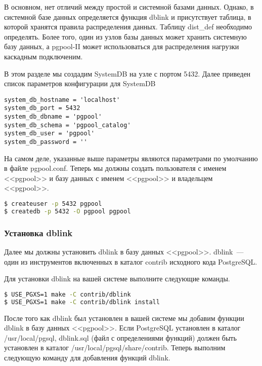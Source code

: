 В основном, нет отличий между простой и системной базами данных. Однако, в системной базе данных определяется функция dblink и присутствует таблица, в которой хранятся правила распределения данных. Таблицу dist\_def необходимо определять. Более того, один из узлов базы данных может хранить системную базу данных, а pgpool-II может использоваться для распределения нагрузки каскадным подключеним.

В этом разделе мы создадим SystemDB на узле с портом 5432. Далее приведен список параметров конфигурации для SystemDB

\begin{lstlisting}[label=lst:pgpool26,caption=Настройка SystemDB]
system_db_hostname = 'localhost'
system_db_port = 5432
system_db_dbname = 'pgpool'
system_db_schema = 'pgpool_catalog'
system_db_user = 'pgpool'
system_db_password = ''
\end{lstlisting}

На самом деле, указанные выше параметры являются параметрами по умолчанию в файле pgpool.conf. Теперь мы должны создать пользователя с именем <<pgpool>> и базу данных с именем <<pgpool>> и владельцем <<pgpool>>.

\begin{lstlisting}[language=Bash,label=lst:pgpool27,caption=Настройка SystemDB]
$ createuser -p 5432 pgpool
$ createdb -p 5432 -O pgpool pgpool
\end{lstlisting}

\subsubsection{Установка dblink}

Далее мы должны установить dblink в базу данных <<pgpool>>. dblink~--- один из инструментов включенных в каталог contrib исходного кода PostgreSQL.

Для установки dblink на вашей системе выполните следующие команды.

\begin{lstlisting}[language=Bash,label=lst:pgpool28,caption=Установка dblink]
$ USE_PGXS=1 make -C contrib/dblink
$ USE_PGXS=1 make -C contrib/dblink install
\end{lstlisting}

После того как dblink был установлен в вашей системе мы добавим функции dblink в базу данных <<pgpool>>. Если PostgreSQL установлен в каталог /usr/local/pgsql, dblink.sql (файл с определениями функций) должен быть установлен в каталог /usr/local/pgsql/share/contrib. Теперь выполним следующую команду для добавления функций dblink.


